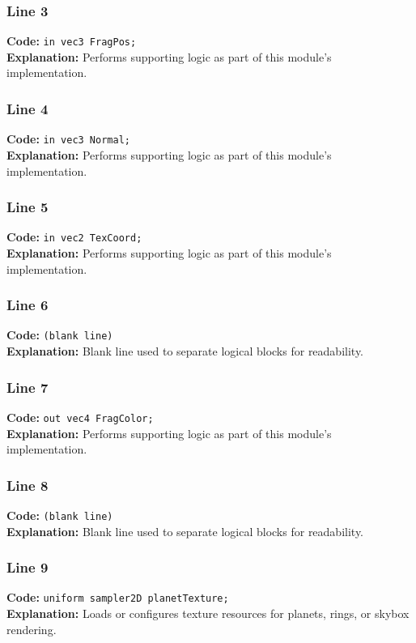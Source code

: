 \documentclass[11pt,a4paper]{article}
\begin{document}
\subsubsection*{Line 3}
\textbf{Code:} \verb|in vec3 FragPos;|\\
\textbf{Explanation:} Performs supporting logic as part of this module's implementation.

\subsubsection*{Line 4}
\textbf{Code:} \verb|in vec3 Normal;|\\
\textbf{Explanation:} Performs supporting logic as part of this module's implementation.

\subsubsection*{Line 5}
\textbf{Code:} \verb|in vec2 TexCoord;|\\
\textbf{Explanation:} Performs supporting logic as part of this module's implementation.

\subsubsection*{Line 6}
\textbf{Code:} \texttt{(blank line)}\\
\textbf{Explanation:} Blank line used to separate logical blocks for readability.

\subsubsection*{Line 7}
\textbf{Code:} \verb|out vec4 FragColor;|\\
\textbf{Explanation:} Performs supporting logic as part of this module's implementation.

\subsubsection*{Line 8}
\textbf{Code:} \texttt{(blank line)}\\
\textbf{Explanation:} Blank line used to separate logical blocks for readability.

\subsubsection*{Line 9}
\textbf{Code:} \verb|uniform sampler2D planetTexture;|\\
\textbf{Explanation:} Loads or configures texture resources for planets, rings, or skybox rendering.
\end{document}
